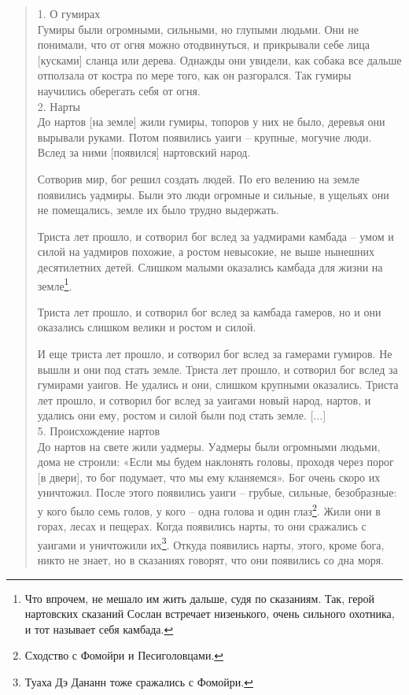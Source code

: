 \begin{quotation}
1. О гумирах\\

Гумиры были огромными, сильными, но глупыми людьми. Они не понимали, что от огня можно отодвинуться, и прикрывали себе лица [кусками] сланца или дерева. Однажды они увидели, как собака все дальше отползала от костра по мере того, как он разгорался. Так гумиры научились оберегать себя от огня.\\

2. Нарты\\

До нартов [на земле] жили гумиры, топоров у них не было, деревья они вырывали руками. Потом появились уаиги – крупные, могучие люди. Вслед за ними [появился] нартовский народ.

Сотворив мир, бог решил создать людей. По его велению на земле появились уадмиры. Были это люди огромные и сильные, в ущельях они не помещались, земле их было трудно выдержать.

Триста лет прошло, и сотворил бог вслед за уадмирами камбада – умом и силой на уадмиров похожие, а ростом невысокие, не выше нынешних десятилетних детей. Слишком малыми оказались камбада для жизни на земле\footnote{Что впрочем, не мешало им жить дальше, судя по сказаниям. Так, герой нартовских сказаний Сослан встречает низенького, очень сильного охотника, и тот называет себя камбада.}.

Триста лет прошло, и сотворил бог вслед за камбада гамеров, но и они оказались слишком велики и ростом и силой.

И еще триста лет прошло, и сотворил бог вслед за гамерами гумиров. Не вышли и они под стать земле. Триста лет прошло, и сотворил бог вслед за гумирами уаигов. Не удались и они, слишком крупными оказались. Триста лет прошло, и сотворил бог вслед за уаигами новый народ, нартов, и удались они ему, ростом и силой были под стать земле. [...] \\

5. Происхождение нартов\\

До нартов на свете жили уадмеры. Уадмеры были огромными людьми, дома не строили: «Если мы будем наклонять головы, проходя через порог [в двери], то бог подумает, что мы ему кланяемся». Бог очень скоро их уничтожил. После этого появились уаиги – грубые, сильные, безобразные: у кого было семь голов, у кого – одна голова и один глаз\footnote{Сходство с Фомойри и Песиголовцами.}. Жили они в горах, лесах и пещерах. Когда появились нарты, то они сражались с уаигами и уничтожили их\footnote{Туаха Дэ Дананн тоже сражались с Фомойри.}. Откуда появились нарты, этого, кроме бога, никто не знает, но в сказаниях говорят, что они появились со дна моря.
\end{quotation}

